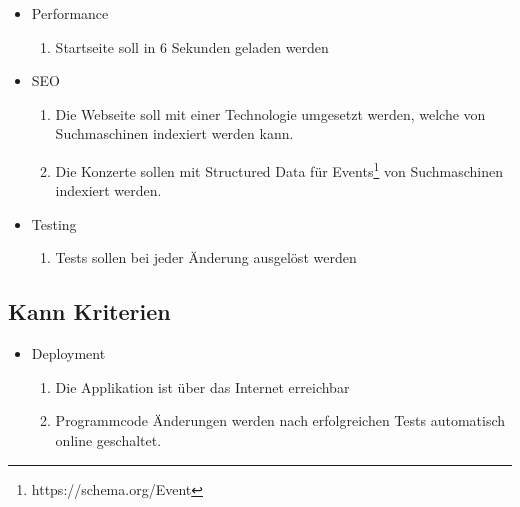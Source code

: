 \begin{itemize}
  \tightlist
  \item
        Performance
        \begin{enumerate}
          \def\labelenumi{\arabic{enumi}.}
          \tightlist
          \item
                Startseite soll in 6 Sekunden geladen werden
        \end{enumerate}
\end{itemize}

\begin{itemize}
  \tightlist
  \item
        SEO
        \begin{enumerate}
          \def\labelenumi{\arabic{enumi}.}
          \tightlist
          \item
                Die Webseite soll mit einer Technologie umgesetzt werden, welche von
                Suchmaschinen indexiert werden kann.
          \item
                Die Konzerte sollen mit Structured Data für Events\footnote{https://schema.org/Event}
                von Suchmaschinen indexiert werden.
        \end{enumerate}
\end{itemize}

\begin{itemize}
  \tightlist
  \item
        Testing
        \begin{enumerate}
          \def\labelenumi{\arabic{enumi}.}
          \tightlist
          \item
                Tests sollen bei jeder Änderung ausgelöst werden
        \end{enumerate}
\end{itemize}

\subsection{Kann Kriterien}\label{kann-kriterien}

\begin{itemize}
  \tightlist
  \item
        Deployment
        \begin{enumerate}
          \def\labelenumi{\arabic{enumi}.}
          \tightlist
          \item
                Die Applikation ist über das Internet erreichbar
          \item
                Programmcode Änderungen werden nach erfolgreichen Tests automatisch
                online geschaltet.
        \end{enumerate}
\end{itemize}

